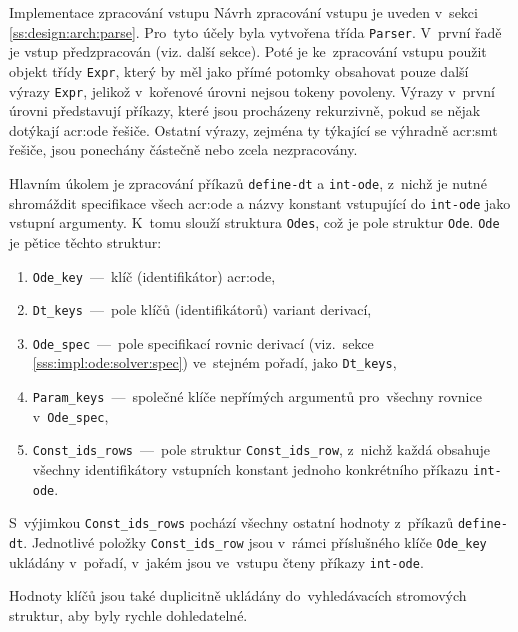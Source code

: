 \documentclass[thesis=M,czech]{FITthesis}[2012/06/26]
\newcommand{\acrlabel}[1]{acr:#1}
\newcommand{\acr}[1]{\acrshort{\acrlabel{#1}}}
\newcommand{\id}[1]{\texttt{#1}}
\newcommand{\rf}[1]{\ref{#1}}
\begin{document}
\begin{section}{Implementace zpracování vstupu}\label{s:impl:parse}
Návrh zpracování vstupu je uveden v~sekci \rf{ss:design:arch:parse}.
Pro~tyto účely byla vytvořena třída \id{Parser}.
V~první řadě je vstup předzpracován (viz. další sekce).
Poté je ke~zpracování vstupu použit objekt třídy \id{Expr},
který by měl jako přímé potomky obsahovat pouze další výrazy \id{Expr},
jelikož v~kořenové úrovni nejsou tokeny povoleny.
Výrazy v~první úrovni představují příkazy,
které jsou procházeny rekurzivně,
pokud se nějak dotýkají \acr{ode} řešiče.
Ostatní výrazy, zejména ty týkající se výhradně \acr{smt} řešiče,
jsou ponechány částečně nebo zcela nezpracovány.

Hlavním úkolem je zpracování příkazů \id{define\--dt} a \id{int\--ode},
z~nichž je nutné shromáždit specifikace všech \acr{ode}
a názvy konstant vstupující do \id{int\--ode} jako vstupní argumenty.
K~tomu slouží struktura \id{Odes},
což je pole struktur \id{Ode}.
\id{Ode} je pětice těchto struktur:
\begin{enumerate}
\item \id{Ode\_\-key}~---~klíč (identifikátor) \acr{ode},
\item \id{Dt\_\-keys}~---~pole klíčů (identifikátorů) variant derivací,
\item \id{Ode\_\-spec}~---~pole specifikací rovnic derivací
   (viz.~sekce \rf{sss:impl:ode:solver:spec})
   ve~stejném pořadí, jako \id{Dt\_\-keys},
\item \id{Param\_\-keys}~---~společné klíče nepřímých argumentů
   pro~všechny rovnice v~\id{Ode\_\-spec},
\item \id{Const\_\-ids\_\-rows}~---~pole struktur
   \id{Const\_\-ids\_\-row}, z~nichž každá obsahuje
   všechny identifikátory vstupních konstant
   jednoho konkrétního příkazu \id{int\--ode}.
\end{enumerate}
S~výjimkou \id{Const\_\-ids\_\-rows}
pochází všechny ostatní hodnoty
z~příkazů \id{define\--dt}.
Jednotlivé položky \id{Const\_\-ids\_\-row} jsou v~rámci
příslušného klíče \id{Ode\_\-key} ukládány v~pořadí,
v~jakém jsou ve~vstupu čteny příkazy \id{int\--ode}.

Hodnoty klíčů jsou také duplicitně ukládány
do~vyhledávacích stromových struktur,
aby byly rychle dohledatelné.


\end{section}
\end{document}
